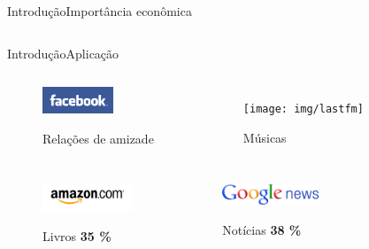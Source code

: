 \begin{frame}{Introdução}{Importância econômica}
\begin{columns}[b]
\end{columns}

\end{frame}


\begin{frame}{Introdução}{Aplicação}
\begin{columns}[c]


\begin{figure}[ht]
    \begin{center}
    \includegraphics[height=30px]{img/facebook}

    Relações de amizade
    \end{center}
\end{figure}


\begin{figure}[ht]
    \begin{center}
    \texttt{[image: img/lastfm]}

    Músicas
    \end{center}
\end{figure}
\end{columns}
\begin{columns}[b]


\begin{figure}[ht]
    \begin{center}
    \includegraphics[height=30px]{img/amazon}

    Livros \textbf{35 \%} \\
    \cite{amazon35}
    \end{center}
\end{figure}

\begin{figure}[ht]
    \begin{center}
    \includegraphics[height=23px]{img/google-news}

    Notícias \textbf{38 \%} \\
    \cite{das2007google}
    \end{center}
\end{figure}


\end{columns}
\end{frame}
